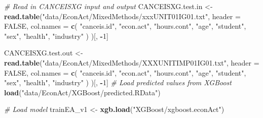 \documentclass[]{book}
\newenvironment{Shaded}{\begin{snugshade}}{\end{snugshade}}
\newcommand{\KeywordTok}[1]{\textcolor[rgb]{0.13,0.29,0.53}{\textbf{#1}}}
\newcommand{\DataTypeTok}[1]{\textcolor[rgb]{0.13,0.29,0.53}{#1}}
\newcommand{\DecValTok}[1]{\textcolor[rgb]{0.00,0.00,0.81}{#1}}
\newcommand{\StringTok}[1]{\textcolor[rgb]{0.31,0.60,0.02}{#1}}
\newcommand{\CommentTok}[1]{\textcolor[rgb]{0.56,0.35,0.01}{\textit{#1}}}
\newcommand{\OtherTok}[1]{\textcolor[rgb]{0.56,0.35,0.01}{#1}}
\newcommand{\OperatorTok}[1]{\textcolor[rgb]{0.81,0.36,0.00}{\textbf{#1}}}
\newcommand{\NormalTok}[1]{#1}
\begin{document}
\begin{Shaded}
\begin{Highlighting}[]
\CommentTok{# Read in CANCEISXG input and output}
\NormalTok{CANCEISXG.test.in <-}\StringTok{ }\KeywordTok{read.table}\NormalTok{(}\StringTok{"data/EconAct/MixedMethods/xxxUNIT01IG01.txt"}\NormalTok{,}
                                \DataTypeTok{header =} \OtherTok{FALSE}\NormalTok{,}
                                \DataTypeTok{col.names =} \KeywordTok{c}\NormalTok{(}
                                  \StringTok{"canceis.id"}\NormalTok{, }\StringTok{"econ.act"}\NormalTok{, }\StringTok{"hours.cont"}\NormalTok{, }
                                  \StringTok{"age"}\NormalTok{, }\StringTok{"student"}\NormalTok{,}
                                  \StringTok{"sex"}\NormalTok{, }\StringTok{"health"}\NormalTok{, }\StringTok{"industry"}
\NormalTok{                                )}
\NormalTok{)[, }\OperatorTok{-}\DecValTok{1}\NormalTok{]}

\NormalTok{CANCEISXG.test.out <-}\StringTok{ }\KeywordTok{read.table}\NormalTok{(}\StringTok{"data/EconAct/MixedMethods/XXXUNITIMP01IG01.txt"}\NormalTok{,}
                                 \DataTypeTok{header =} \OtherTok{FALSE}\NormalTok{,}
                                 \DataTypeTok{col.names =} \KeywordTok{c}\NormalTok{(}
                                   \StringTok{"canceis.id"}\NormalTok{, }\StringTok{"econ.act"}\NormalTok{, }\StringTok{"hours.cont"}\NormalTok{, }
                                   \StringTok{"age"}\NormalTok{, }\StringTok{"student"}\NormalTok{,}
                                   \StringTok{"sex"}\NormalTok{, }\StringTok{"health"}\NormalTok{, }\StringTok{"industry"}
\NormalTok{                                 )}
\NormalTok{)[, }\OperatorTok{-}\DecValTok{1}\NormalTok{]}
\CommentTok{# Load predicted values from XGBoost}
\KeywordTok{load}\NormalTok{(}\StringTok{"data/EconAct/XGBoost/predicted.RData"}\NormalTok{)}

\CommentTok{# Load model}
\NormalTok{trainEA_v1 <-}\StringTok{ }\KeywordTok{xgb.load}\NormalTok{(}\StringTok{"XGBoost/xgboost.econAct"}\NormalTok{)}
\end{Highlighting}
\end{Shaded}
\end{document}
